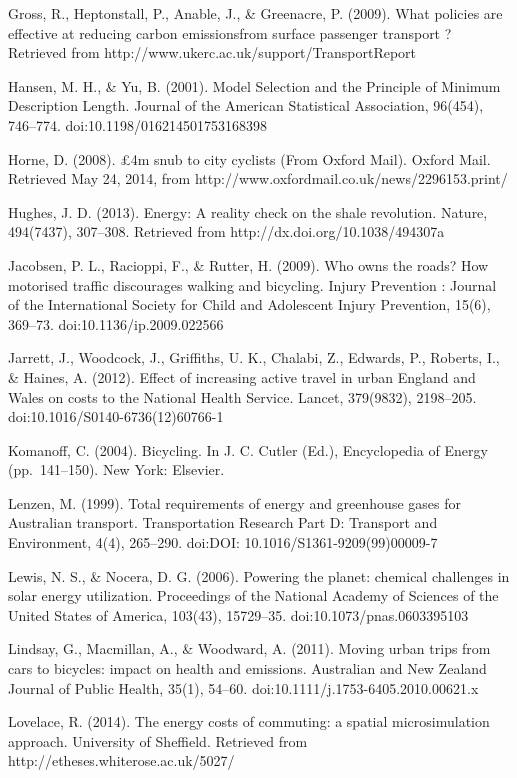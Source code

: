 Gross, R., Heptonstall, P., Anable, J., \& Greenacre, P. (2009). What
policies are effective at reducing carbon emissionsfrom surface
passenger transport ? Retrieved from
http://www.ukerc.ac.uk/support/TransportReport

Hansen, M. H., \& Yu, B. (2001). Model Selection and the Principle of
Minimum Description Length. Journal of the American Statistical
Association, 96(454), 746--774. doi:10.1198/016214501753168398

Horne, D. (2008). £4m snub to city cyclists (From Oxford Mail). Oxford
Mail. Retrieved May 24, 2014, from
http://www.oxfordmail.co.uk/news/2296153.print/

Hughes, J. D. (2013). Energy: A reality check on the shale revolution.
Nature, 494(7437), 307--308. Retrieved from
http://dx.doi.org/10.1038/494307a

Jacobsen, P. L., Racioppi, F., \& Rutter, H. (2009). Who owns the roads?
How motorised traffic discourages walking and bicycling. Injury
Prevention : Journal of the International Society for Child and
Adolescent Injury Prevention, 15(6), 369--73. doi:10.1136/ip.2009.022566

Jarrett, J., Woodcock, J., Griffiths, U. K., Chalabi, Z., Edwards, P.,
Roberts, I., \& Haines, A. (2012). Effect of increasing active travel in
urban England and Wales on costs to the National Health Service. Lancet,
379(9832), 2198--205. doi:10.1016/S0140-6736(12)60766-1

Komanoff, C. (2004). Bicycling. In J. C. Cutler (Ed.), Encyclopedia of
Energy (pp.~141--150). New York: Elsevier.

Lenzen, M. (1999). Total requirements of energy and greenhouse gases for
Australian transport. Transportation Research Part D: Transport and
Environment, 4(4), 265--290. doi:DOI: 10.1016/S1361-9209(99)00009-7

Lewis, N. S., \& Nocera, D. G. (2006). Powering the planet: chemical
challenges in solar energy utilization. Proceedings of the National
Academy of Sciences of the United States of America, 103(43), 15729--35.
doi:10.1073/pnas.0603395103

Lindsay, G., Macmillan, A., \& Woodward, A. (2011). Moving urban trips
from cars to bicycles: impact on health and emissions. Australian and
New Zealand Journal of Public Health, 35(1), 54--60.
doi:10.1111/j.1753-6405.2010.00621.x

Lovelace, R. (2014). The energy costs of commuting: a spatial
microsimulation approach. University of Sheffield. Retrieved from
http://etheses.whiterose.ac.uk/5027/

